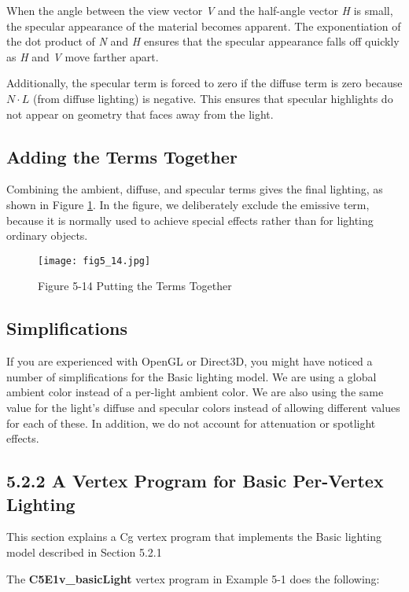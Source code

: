 \documentclass[../main.tex]{subfiles}
\begin{document}
When the angle between the view vector \textit{V} and the half-angle vector \textit{H} is small, the specular appearance of the material becomes apparent. The exponentiation of the dot product of \textit{N} and \textit{H} ensures that the specular appearance falls off quickly as \textit{H} and \textit{V} move farther apart.

Additionally, the specular term is forced to zero if the diffuse term is zero because $N \cdot L$ (from diffuse lighting) is negative. This ensures that specular highlights do not appear on geometry that faces away from the light.

\subsection*{Adding the Terms Together}

Combining the ambient, diffuse, and specular terms gives the final lighting, as shown in Figure \ref{fig:5-14}. In the figure, we deliberately exclude the emissive term, because it is normally used to achieve special effects rather than for lighting ordinary objects.

\begin{figure}
    \centering
    \texttt{[image: fig5\_14.jpg]}
    \caption{Figure 5-14 Putting the Terms Together}
    \label{fig:5-14}
\end{figure}

\subsection*{Simplifications}

If you are experienced with OpenGL or Direct3D, you might have noticed a number of simplifications for the Basic lighting model. We are using a global ambient color instead of a per-light ambient color. We are also using the same value for the light's diffuse and specular colors instead of allowing different values for each of these. In addition, we do not account for attenuation or spotlight effects.

\subsection{5.2.2 A Vertex Program for Basic Per-Vertex Lighting}

This section explains a Cg vertex program that implements the Basic lighting model described in Section 5.2.1

The \textbf{C5E1v_basicLight} vertex program in Example 5-1 does the following:
\end{document}

